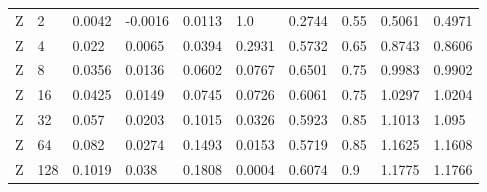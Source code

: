 \begin{table}
\begin{ruledtabular}
\begin{tabular}{llllllllll}
Z & 2 & 0.0042 & -0.0016 & 0.0113 & 1.0 & 0.2744 & 0.55 & 0.5061 & 0.4971 \\
Z & 4 & 0.022 & 0.0065 & 0.0394 & 0.2931 & 0.5732 & 0.65 & 0.8743 & 0.8606 \\
Z & 8 & 0.0356 & 0.0136 & 0.0602 & 0.0767 & 0.6501 & 0.75 & 0.9983 & 0.9902 \\
Z & 16 & 0.0425 & 0.0149 & 0.0745 & 0.0726 & 0.6061 & 0.75 & 1.0297 & 1.0204 \\
Z & 32 & 0.057 & 0.0203 & 0.1015 & 0.0326 & 0.5923 & 0.85 & 1.1013 & 1.095 \\
Z & 64 & 0.082 & 0.0274 & 0.1493 & 0.0153 & 0.5719 & 0.85 & 1.1625 & 1.1608 \\
Z & 128 & 0.1019 & 0.038 & 0.1808 & 0.0004 & 0.6074 & 0.9 & 1.1775 & 1.1766 \\
\end{tabular}
\end{ruledtabular}
\end{table}